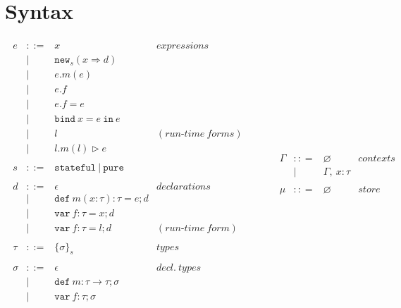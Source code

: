 \documentclass{llncs}
\newcommand{\keywadj}[1]{\mathtt{#1}}
\newcommand{\keyw}[1]{\keywadj{#1}~}
\begin{document}
\section{Syntax}

\[
\begin{array}{lll}
\begin{array}{lllr}
e & ::= & x & expressions \\
& | & \keywadj{new}_{s}(x \Rightarrow d) \\
& | & e.m(e)\\
& | & e.f \\
& | & e.f = e \\
& | & \keyw{bind} x = e~\keyw{in} e \\
& | & l & (run\mbox{-}time~forms)\\
& | & l.m(l) \rhd e \\
&&\\
s & ::= & \keyw{stateful} | ~\keyw{pure} \\
&&\\
d & ::= & \epsilon & declarations \\
  & |   & \keyw{def} m(x:\tau):\tau = e; d \\
  & |   & \keyw{var} f:\tau = x; d \\
  & |   & \keyw{var} f:\tau = l; d & (run\mbox{-}time~form)\\
&&\\
\tau & ::= & \{ \sigma \}_{s} & types \\
&&\\
\sigma & ::= & \epsilon & decl.~ types \\
       & |   & \keyw{def} m:\tau \rightarrow \tau; \sigma \\
       & |   & \keyw{var} f:\tau; \sigma \\
&&\\
\end{array}
& ~~~~~~
&
\begin{array}{lllr}
\Gamma & :: = & \varnothing & contexts\\
& | & \Gamma,~x : \tau\\
&&\\
\mu & :: = & \varnothing & store\\

\end{array}
\end{array}\]
\end{document}
